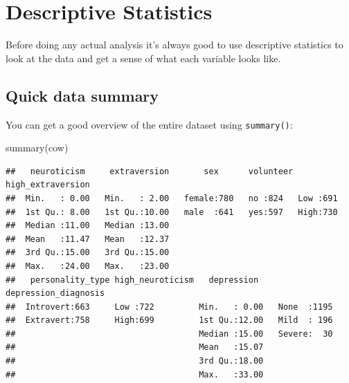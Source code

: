 \documentclass[
]{book}
\newenvironment{Shaded}{\begin{snugshade}}{\end{snugshade}}
\newcommand{\AttributeTok}[1]{\textcolor[rgb]{0.77,0.63,0.00}{#1}}
\newcommand{\ConstantTok}[1]{\textcolor[rgb]{0.00,0.00,0.00}{#1}}
\newcommand{\DecValTok}[1]{\textcolor[rgb]{0.00,0.00,0.81}{#1}}
\newcommand{\FunctionTok}[1]{\textcolor[rgb]{0.00,0.00,0.00}{#1}}
\newcommand{\NormalTok}[1]{#1}
\newcommand{\OtherTok}[1]{\textcolor[rgb]{0.56,0.35,0.01}{#1}}
\newcommand{\SpecialCharTok}[1]{\textcolor[rgb]{0.00,0.00,0.00}{#1}}
\newcommand{\StringTok}[1]{\textcolor[rgb]{0.31,0.60,0.02}{#1}}
\begin{document}
\begin{Shaded}
\end{Shaded}

\hypertarget{descriptive-statistics}{%
\section{Descriptive Statistics}\label{descriptive-statistics}}

Before doing any actual analysis it's always good to use
descriptive statistics to look at the data and get a sense
of what each variable looks like.

\hypertarget{quick-data-summary}{%
\subsection{Quick data summary}\label{quick-data-summary}}

You can get a good overview of the entire dataset using
\texttt{summary()}:

\begin{Shaded}
\begin{Highlighting}[]
\FunctionTok{summary}\NormalTok{(cow)}
\end{Highlighting}
\end{Shaded}

\begin{verbatim}
##   neuroticism     extraversion       sex      volunteer high_extraversion
##  Min.   : 0.00   Min.   : 2.00   female:780   no :824   Low :691         
##  1st Qu.: 8.00   1st Qu.:10.00   male  :641   yes:597   High:730         
##  Median :11.00   Median :13.00                                           
##  Mean   :11.47   Mean   :12.37                                           
##  3rd Qu.:15.00   3rd Qu.:15.00                                           
##  Max.   :24.00   Max.   :23.00                                           
##   personality_type high_neuroticism   depression    depression_diagnosis
##  Introvert:663     Low :722         Min.   : 0.00   None  :1195         
##  Extravert:758     High:699         1st Qu.:12.00   Mild  : 196         
##                                     Median :15.00   Severe:  30         
##                                     Mean   :15.07                       
##                                     3rd Qu.:18.00                       
##                                     Max.   :33.00
\end{verbatim}
\end{document}
